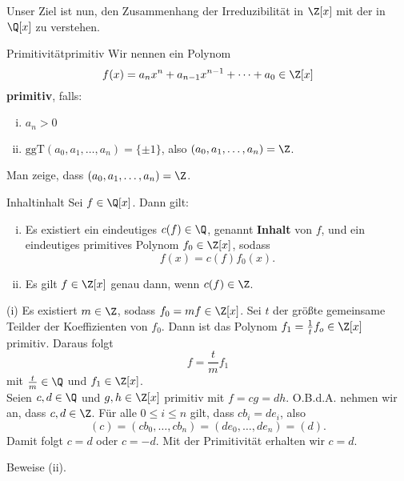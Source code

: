Unser Ziel ist nun, den Zusammenhang der Irreduzibilität in $\Z[x]$ mit der in $\Q[x]$ zu verstehen.
\begin{definition}{Primitivität}{primitiv}
Wir nennen ein Polynom 
\begin{equation}
f(x) = a_nx^n+a_{n-1}x^{n-1} + \cdots + a_0 \in \Z[x]
\end{equation}
\textbf{primitiv}, falls:
\begin{enumerate}[(i)]
\item $a_n > 0$ 
\item $\text{ggT} (a_0, a_1, \dots, a_n) = \{\pm 1\}$, also $(a_0, a_1, \dots, a_n) = \Z$.
\end{enumerate}
\end{definition}
\begin{übung}
Man zeige, dass $(a_0,a_1, \dots, a_n)=\Z$.
\end{übung}
\begin{lemma}{Inhalt}{inhalt}
Sei $f \in \Q[x]$. Dann gilt:
\begin{enumerate}[(i)]
\item Es existiert ein eindeutiges $c(f) \in \Q$, genannt \textbf{Inhalt} von $f$, und ein eindeutiges primitives Polynom $f_0 \in \Z[x]$, sodass 
\begin{equation}
f(x) = c(f) f_0(x).
\end{equation}
\item Es gilt $f \in \Z[x]$ genau dann, wenn $c(f) \in \Z$.
\end{enumerate}
\end{lemma}
\begin{beweis}
(i) Es existiert $m \in \Z$, sodass $f_0 = m f \in \Z[x]$. Sei $t$ der größte gemeinsame Teilder der Koeffizienten von $f_0$. Dann ist das Polynom $f_1 = \frac{1}{t} f_o \in \Z[x]$ primitiv. Daraus folgt
\begin{equation}
f= \frac{t}{m} f_1
\end{equation}
mit $\frac{t}{m} \in \Q$ und $f_1 \in \Z[x]$.\\
Seien $c,d \in \Q$ und $g,h \in \Z[x]$ primitiv mit $f=cg=dh$. O.B.d.A. nehmen wir an, dass $c,d \in \Z$. Für alle $0 \leq i \leq n$ gilt, dass $cb_i = de_i$, also
\begin{equation}
(c) = (cb_0, \dots, cb_n) = (de_0, \dots, de_n)=(d).
\end{equation}
Damit folgt $c=d$ oder $c = -d$. Mit der Primitivität erhalten wir $c=d$.
\end{beweis}
\begin{übung}
Beweise (ii).
\end{übung}
